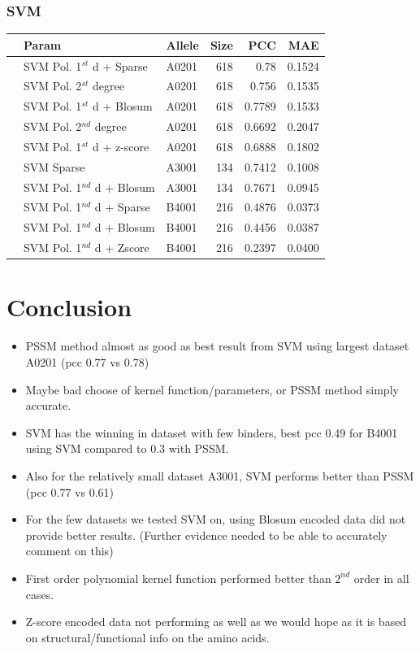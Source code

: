 \documentclass[presentation]{beamer}   %
\begin{document}
 \frametitle{SVM}
\begin{frame}
\begin{table}[ht]\scriptsize
\begin{center}
\begin{tabular}{rllrrr}
  \hline
 & Param & Allele & Size & PCC & MAE \\ 
  \hline
 & SVM Pol. 1$^{st}$ d + Sparse & A0201 &   618 & 0.78 & 0.1524 \\ 
 & SVM Pol. 2$^{st}$ degree & A0201 &   618 & 0.756 & 0.1535 \\ 
 & SVM Pol. 1$^{st}$ d + Blosum & A0201 &   618 & 0.7789 & 0.1533 \\ 
 & SVM Pol. 2$^{nd}$ degree & A0201 &   618 & 0.6692 & 0.2047 \\ 
 & SVM Pol. 1$^{st}$ d + z-score & A0201 &   618 & 0.6888 & 0.1802 \\ 
 & SVM Sparse & A3001 &   134 & 0.7412 & 0.1008 \\ 
 & SVM Pol. 1$^{nd}$ d + Blosum & A3001 &   134 & 0.7671 & 0.0945 \\ 
 & SVM Pol. 1$^{nd}$ d + Sparse & B4001 &   216 & 0.4876 & 0.0373 \\ 
 & SVM Pol. 1$^{nd}$ d + Blosum & B4001 &   216 & 0.4456 & 0.0387 \\ 
 & SVM Pol. 1$^{nd}$ d + Zscore & B4001 &   216 & 0.2397 & 0.0400 \\ 
   \hline
\end{tabular}
\end{center}
\end{table}
\end{frame}

\section{Conclusion}
\begin{frame}
\begin{itemize}
\item<1> PSSM method almost as good as best result from SVM using largest dataset A0201 (pcc 0.77 vs 0.78)
\item<2> Maybe bad choose of kernel function/parameters, or PSSM method simply accurate.
\item<3> SVM has the winning in dataset with few binders, best pcc 0.49 for B4001 using SVM compared to 0.3 with PSSM.
\item<4> Also for the relatively small dataset A3001, SVM performs better than PSSM (pcc 0.77 vs 0.61)
\item<5> For the few datasets we tested SVM on, using Blosum encoded data did not provide better results. (Further evidence needed to be able to accurately comment on this)
\item<6> First order polynomial kernel function performed better than $2^{nd}$ order in all cases.
\item<7> Z-score encoded data not performing as well as we would hope as it is based on structural/functional info on the amino acids.
\end{itemize}
\end{frame}
\end{document}
